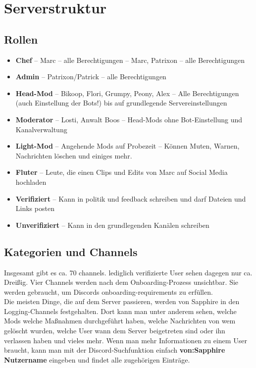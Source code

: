 \documentclass[a4paper,12pt]{article}
\begin{document}
\section{Serverstruktur}
\label{sec:serverstruktur}
\subsection{Rollen}
\begin{itemize}
    \item \textbf{Chef} -- Marc -- alle Berechtigungen
     -- Marc, Patrixon
     -- alle Berechtigungen
    \item \textbf{Admin} -- Patrixon/Patrick -- alle Berechtigungen
    \item \textbf{Head-Mod} -- Bikoop, Flori, Grumpy, Peony, Alex -- Alle Berechtigungen (auch Einstellung der Bots!) bis auf grundlegende Servereinstellungen
    \item \textbf{Moderator} -- Losti, Anwalt Boos -- Head-Mods ohne Bot-Einstellung und Kanalverwaltung
    \item \textbf{Light-Mod} -- Angehende Mods auf Probezeit -- Können Muten, Warnen, Nachrichten löschen und einiges mehr.
    \item \textbf{Fluter} -- Leute, die einen Clips und Edits von Marc auf Social Media hochladen
    \item \textbf{Verifiziert} -- Kann in politik und feedback schreiben und darf Dateien und Links posten
    \item \textbf{Unverifiziert} -- Kann in den grundlegenden Kanälen schreiben
\end{itemize}
\subsection{Kategorien und Channels}
Insgesamt gibt es ca. 70 channels. lediglich verifizierte User sehen dagegen nur ca. Dreißig. Vier Channels werden nach dem Onboarding-Prozess unsichtbar. Sie werden gebraucht, um Discords
onboarding-requirements zu erfüllen.\\
Die meisten Dinge, die auf dem Server passieren, werden von Sapphire in den Logging-Channels festgehalten. Dort kann man unter anderem sehen, welche Mods
welche Maßnahmen durchgeführt haben, welche Nachrichten von wem gelöscht wurden, welche User wann dem Server beigetreten sind oder ihn verlassen haben und vieles mehr.
Wenn man mehr Informationen zu einem User braucht, kann man mit der Discord-Suchfunktion einfach \textbf{von:Sapphire Nutzername} eingeben und findet alle zugehörigen Einträge.\\
\end{document}
